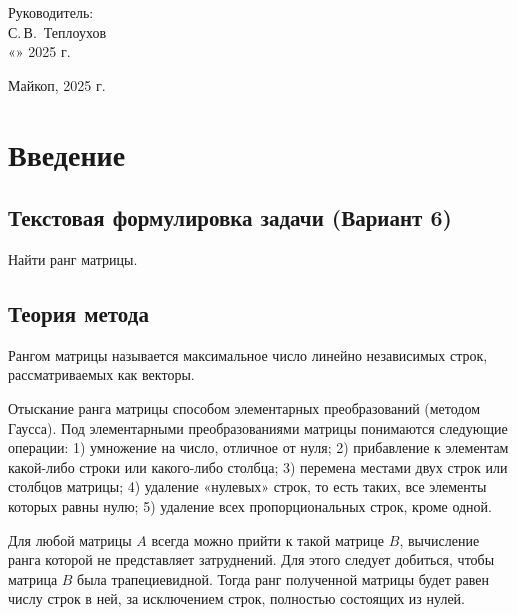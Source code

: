 \documentclass[a4paper,12pt]{article}
\begin{document}
\begin{titlepage}
		\hfill\begin{minipage}{0.5\textwidth}
			Руководитель:\\
			\underline{\hspace{\ML}} С.\,В.~Теплоухов\\
			«\underline{\hspace{0.7cm}}» \underline{\hspace{2cm}} 2025 г.
		\end{minipage}%
		\vfill
		
		\begin{center}
			Майкоп, 2025 г.
		\end{center}
	\end{titlepage}



\section{Введение}
\label{sec:intro}
\subsection{Текстовая формулировка задачи (Вариант 6)}
Найти ранг матрицы.

\subsection{Теория метода}
Рангом матрицы называется максимальное число линейно независимых строк, рассматриваемых как векторы.

Отыскание ранга матрицы способом элементарных преобразований (методом Гаусса).  
Под элементарными преобразованиями матрицы понимаются следующие операции:  
1) умножение на число, отличное от нуля;  
2) прибавление к элементам какой-либо строки или какого-либо столбца;  
3) перемена местами двух строк или столбцов матрицы;  
4) удаление «нулевых» строк, то есть таких, все элементы которых равны нулю;  
5) удаление всех пропорциональных строк, кроме одной.

Для любой матрицы \(A\) всегда можно прийти к такой матрице \(B\), вычисление ранга которой не представляет затруднений. Для этого следует добиться, чтобы матрица \(B\) была трапециевидной. Тогда ранг полученной матрицы будет равен числу строк в ней, за исключением строк, полностью состоящих из нулей.
\end{document}
